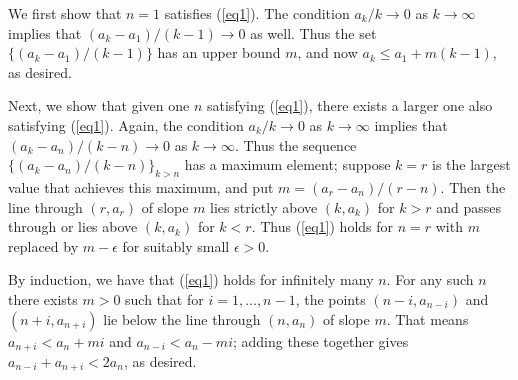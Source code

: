 \documentclass[amssymb,twocolumn,pra,10pt,aps]{revtex4-1}
\begin{document}
\begin{itemize}
We first show that $n=1$ satisfies (\ref{eq1}). The condition
$a_k/k \to 0$ as $k \to \infty$
implies that $(a_k - a_1)/(k-1) \to 0$ as well. Thus the
set $\{(a_k-a_1)/(k-1)\}$ has an upper bound $m$, and now
$a_k \leq a_1 + m(k-1)$, as desired.

Next, we show that given one $n$ satisfying (\ref{eq1}), there exists a
larger one also satisfying (\ref{eq1}). Again, the condition
$a_k/k \to 0$ as $k \to \infty$ implies that $(a_k-a_n)/(k-n) \to 0$ as
$k \to \infty$. Thus the sequence $\{(a_k-a_n)/(k-n)\}_{k>n}$ has a
maximum element; suppose $k = r$ is the largest value that
achieves this maximum, and put
$m = (a_r -a_n)/(r-n)$. Then the line through
$(r, a_r)$ of slope $m$ lies strictly above $(k, a_k)$ for $k > r$
and passes through or lies above $(k, a_k)$ for $k< r$.
Thus (\ref{eq1})
holds for $n=r$ with $m$ replaced by $m-\epsilon$ for suitably small
$\epsilon > 0$.

By induction, we have that (\ref{eq1}) holds for infinitely many $n$.
For any such $n$ there exists $m>0$ such that for $i=1, \dots, n-1$, the
points $(n-i, a_{n-i})$ and $(n+i, a_{n+i})$ lie below the line through
$(n, a_n)$ of slope $m$. That means $a_{n+i} < a_n + mi$
and $a_{n-i} < a_n - mi$; adding these together gives
$a_{n-i} + a_{n+i} < 2a_n$, as desired.

\end{itemize}
\end{document}
